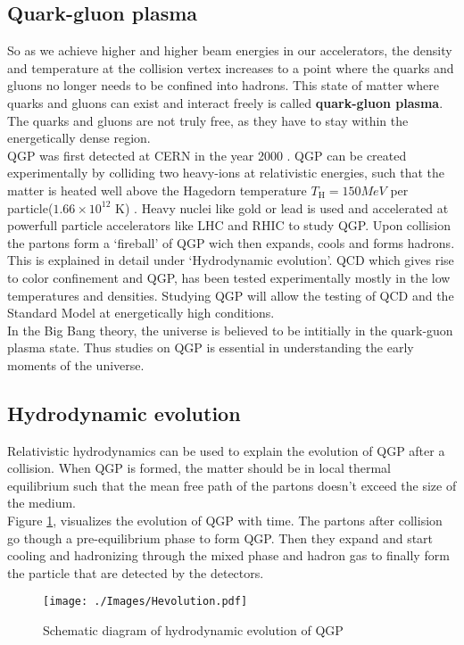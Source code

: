 \documentclass[12pt,a4paper,twoside]{report}
\begin{document}
\subsection{Quark-gluon plasma}
So as we achieve higher and higher beam energies in our accelerators, the density and temperature at the collision vertex increases to a point where the quarks and gluons no longer needs to be confined into hadrons. This state of matter where quarks and gluons can exist and interact freely is called \textbf{quark-gluon plasma}. The quarks and gluons are not truly free, as they have to stay within the energetically dense region.\\

QGP was first detected at CERN in the year 2000 \cite{Ref:QGP-discovery}. QGP can be created experimentally by colliding two heavy-ions at relativistic energies, such that the matter is heated well above the Hagedorn temperature $T_\mathrm{H}=150MeV$ per particle($1.66\times10^{12}$ K) \cite{Ref:Hagedorn}. Heavy nuclei like gold or lead is used and accelerated at powerfull particle accelerators like LHC and RHIC to study QGP. Upon collision the partons form a `fireball' of QGP wich then expands, cools and forms hadrons. This is explained in detail under `Hydrodynamic evolution'.
QCD which gives rise to color confinement and QGP, has been tested experimentally mostly in the low temperatures and densities. Studying QGP will allow the testing of QCD and the Standard Model at energetically high conditions.\\
In the Big Bang theory, the universe is believed to be intitially in the quark-guon plasma state. Thus studies on QGP is essential in understanding the 
early moments of the universe.
\subsection{Hydrodynamic evolution}
Relativistic hydrodynamics can be used to explain the evolution of QGP after a collision. When QGP is formed, the matter should be in local thermal equilibrium such that the mean free path of the partons doesn't exceed the size of the medium.\\

Figure \ref{fig:hydrodynamics}, visualizes the evolution of QGP with time. The partons after collision go though a pre-equilibrium phase to form QGP. Then they expand and start cooling and hadronizing through the mixed phase and hadron gas to finally form the particle that are detected by the detectors.
\begin{figure}[H]
	\centering
	\texttt{[image: ./Images/Hevolution.pdf]}
	\caption{\label{fig:hydrodynamics}Schematic diagram of hydrodynamic evolution of QGP}
\end{figure}
\end{document}
